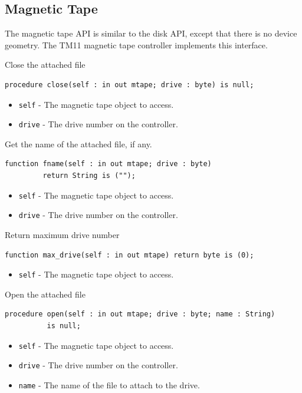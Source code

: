 \documentclass[10pt, openany]{book}
\newcommand{\keyword}[1]{\texttt{#1}}
\begin{document}
\subsection{Magnetic Tape}
The magnetic tape API is similar to the disk API, except that there is no device geometry.  The TM11 magnetic tape controller implements this interface.

Close the attached file
\begin{lstlisting}
procedure close(self : in out mtape; drive : byte) is null;
\end{lstlisting}
\begin{itemize}
  \item \keyword{self} - The magnetic tape object to access.
  \item \keyword{drive} - The drive number on the controller.
\end{itemize}

Get the name of the attached file, if any.
\begin{lstlisting}
function fname(self : in out mtape; drive : byte)
         return String is ("");
\end{lstlisting}
\begin{itemize}
  \item \keyword{self} - The magnetic tape object to access.
  \item \keyword{drive} - The drive number on the controller.
\end{itemize}

Return maximum drive number
\begin{lstlisting}
function max_drive(self : in out mtape) return byte is (0);
\end{lstlisting}
\begin{itemize}
  \item \keyword{self} - The magnetic tape object to access.
\end{itemize}

Open the attached file
\begin{lstlisting}
procedure open(self : in out mtape; drive : byte; name : String)
          is null;
\end{lstlisting}
\begin{itemize}
  \item \keyword{self} - The magnetic tape object to access.
  \item \keyword{drive} - The drive number on the controller.
  \item \keyword{name} - The name of the file to attach to the drive.
\end{itemize}
\end{document}
